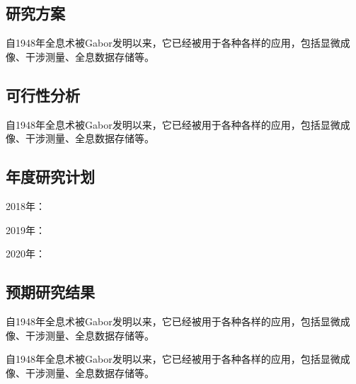 \documentclass[a4paper, 12pt]{extarticle}
\begin{document}

\subsection{研究方案}
自1948年全息术被Gabor发明以来\cite{Gabor_1948_nature}，它已经被用于各种各样的应用，包括显微成像、干涉测量、全息数据存储等\cite{Goodman_2005}。

\subsection{可行性分析}%

自1948年全息术被Gabor发明以来\cite{Gabor_1948_nature}，它已经被用于各种各样的应用，包括显微成像、干涉测量、全息数据存储等\cite{Goodman_2005}。




\subsection{年度研究计划}%

2018年：

2019年：

2020年：


\subsection{预期研究结果}


自1948年全息术被Gabor发明以来\cite{Gabor_1948_nature}，它已经被用于各种各样的应用，包括显微成像、干涉测量、全息数据存储等\cite{Goodman_2005}。


自1948年全息术被Gabor发明以来\cite{Gabor_1948_nature}，它已经被用于各种各样的应用，包括显微成像、干涉测量、全息数据存储等\cite{Goodman_2005}。
\end{document}
